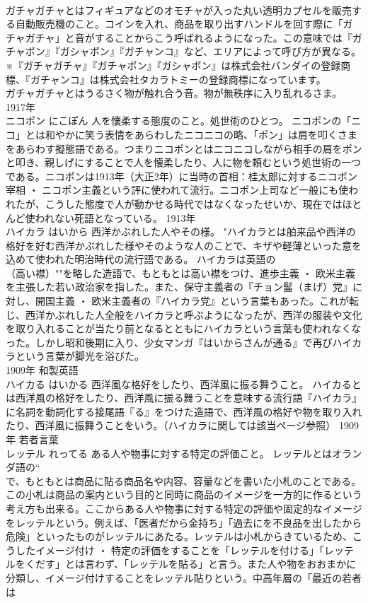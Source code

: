 \documentclass[8pt]{extreport}
\begin{document}
\begin{CJK}{UTF8}{min}
\\	ガチャガチャとはフィギュアなどのオモチャが入った丸い透明カプセルを販売する自動販売機のこと。コインを入れ、商品を取り出すハンドルを回す際に「ガチャガチャ」と音がすることからこう呼ばれるようになった。この意味では『ガチャポン』『ガシャポン』『ガチャンコ』など、エリアによって呼び方が異なる。 ※『ガチャガチャ』『ガチャポン』『ガシャポン』は株式会社バンダイの登録商標、『ガチャンコ』は株式会社タカラトミーの登録商標になっています。 
\\	ガチャガチャとはうるさく物が触れ合う音。物が無秩序に入り乱れるさま。	1917年	
\\	ニコポン	にこぽん	人を懐柔する態度のこと。処世術のひとつ。	ニコポンの「ニコ」とは和やかに笑う表情をあらわしたニコニコの略、「ポン」は肩を叩くさまをあらわす擬態語である。つまりニコポンとはニコニコしながら相手の肩をポンと叩き、親しげにすることで人を懐柔したり、人に物を頼むという処世術の一つである。ニコポンは1913年（大正2年）に当時の首相：桂太郎に対するニコポン宰相 ・ ニコポン主義という評に使われて流行。ニコポン上司など一般にも使われたが、こうした態度で人が動かせる時代ではなくなったせいか、現在ではほとんど使われない死語となっている。	1913年	
\\	ハイカラ	はいから	西洋かぶれした人やその様。	"ハイカラとは舶来品や西洋の格好を好む西洋かぶれした様やそのような人のことで、キザや軽薄といった意を込めて使われた明治時代の流行語である。 ハイカラは英語の
\\	（高い襟）""を略した造語で、もともとは高い襟をつけ、進歩主義 ・ 欧米主義を主張した若い政治家を指した。また、保守主義者の『チョン髷（まげ）党』に対し、開国主義 ・ 欧米主義者の『ハイカラ党』という言葉もあった。これが転じ、西洋かぶれした人全般をハイカラと呼ぶようになったが、西洋の服装や文化を取り入れることが当たり前となるとともにハイカラという言葉も使われなくなった。しかし昭和後期に入り、少女マンガ『はいからさんが通る』で再びハイカラという言葉が脚光を浴びた。
\\	1909年	和製英語	
\\	ハイカる	はいかる	西洋風な格好をしたり、西洋風に振る舞うこと。	ハイカるとは西洋風の格好をしたり、西洋風に振る舞うことを意味する流行語『ハイカラ』に名詞を動詞化する接尾語『る』をつけた造語で、西洋風の格好や物を取り入れたり、西洋風に振舞うことをいう。（ハイカラに関しては該当ページ参照）	1909年	若者言葉	
\\	レッテル	れってる	ある人や物事に対する特定の評価こと。	レッテルとはオランダ語の“
\\	で、もともとは商品に貼る商品名や内容、容量などを書いた小札のことである。この小札は商品の案内という目的と同時に商品のイメージを一方的に作るという考え方も出来る。ここからある人や物事に対する特定の評価や固定的なイメージをレッテルという。例えば、「医者だから金持ち」「過去にを不良品を出したから危険」といったものがレッテルにあたる。レッテルは小札からきているため、こうしたイメージ付け ・ 特定の評価をすることを「レッテルを付ける」「レッテルをくだす」とは言わず、「レッテルを貼る」と言う。また人や物をおおまかに分類し、イメージ付けすることをレッテル貼りという。中高年層の「最近の若者は

\end{CJK}
\end{document}
